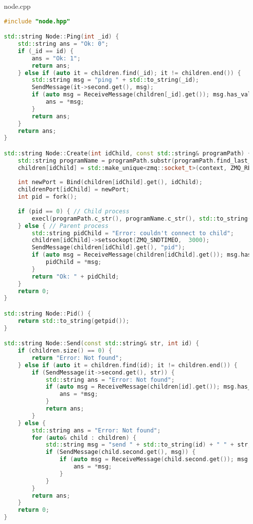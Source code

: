\documentclass[a4paper, 12pt]{article}
\begin{document}
node.cpp
\begin{lstlisting}[language=C++]
#include "node.hpp"

std::string Node::Ping(int _id) {
    std::string ans = "Ok: 0";
    if (_id == id) {
        ans = "Ok: 1";
        return ans;
    } else if (auto it = children.find(_id); it != children.end()) {
        std::string msg = "ping " + std::to_string(_id);
        SendMessage(it->second.get(), msg);          
        if (auto msg = ReceiveMessage(children[_id].get()); msg.has_value(), msg == "Ok: 1") {
            ans = *msg;
        }
        return ans;
    }
    return ans;
} 

std::string Node::Create(int idChild, const std::string& programPath) {
    std::string programName = programPath.substr(programPath.find_last_of("/") + 1);
    children[idChild] = std::make_unique<zmq::socket_t>(context, ZMQ_REQ);
    
    int newPort = Bind(children[idChild].get(), idChild);
    childrenPort[idChild] = newPort;
    int pid = fork();
    
    if (pid == 0) { // Child process
        execl(programPath.c_str(), programName.c_str(), std::to_string(idChild).c_str(), std::to_string(newPort).c_str(), nullptr);
    } else { // Parent process
        std::string pidChild = "Error: couldn't connect to child";
        children[idChild]->setsockopt(ZMQ_SNDTIMEO,  3000);
        SendMessage(children[idChild].get(), "pid");
        if (auto msg = ReceiveMessage(children[idChild].get()); msg.has_value()) {
            pidChild = *msg;
        }
        return "Ok: " + pidChild;
    }
    return 0;
}

std::string Node::Pid() {
    return std::to_string(getpid());
}

std::string Node::Send(const std::string& str, int id) {
    if (children.size() == 0) {
        return "Error: Not found";
    } else if (auto it = children.find(id); it != children.end()) {
        if (SendMessage(it->second.get(), str)) {
            std::string ans = "Error: Not found";
            if (auto msg = ReceiveMessage(children[id].get()); msg.has_value()) {
                ans = *msg;
            }
            return ans;
        }
    } else {
        std::string ans = "Error: Not found";
        for (auto& child : children) {
            std::string msg = "send " + std::to_string(id) + " " + str;
            if (SendMessage(child.second.get(), msg)) {
                if (auto msg = ReceiveMessage(child.second.get()); msg.has_value()) {
                    ans = *msg;
                }
            }
        }
        return ans;
    }
    return 0;
}


\end{lstlisting}
\end{document}
